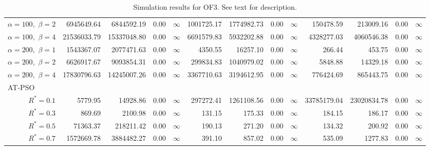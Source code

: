 \documentclass[cmbright]{staauth}
\begin{document}
\begin{table}[ht]
{\begin{tabular}{r|rrrr|rrrr|rrrr}
  $\alpha = 100,$ $\beta =2$ & 6945649.64 & 6844592.19 & 0.00 & $\infty$ & 1001725.17 & 1774982.73 & 0.00 & $\infty$ & 150478.59 & 213009.16 & 0.00 & $\infty$ \\
  $\alpha = 100,$ $\beta =4$ & 21536033.79 & 15337048.80 & 0.00 & $\infty$ & 6691579.83 & 5932202.88 & 0.00 & $\infty$ & 4328277.03 & 4060546.38 & 0.00 & $\infty$ \\
  $\alpha = 200,$ $\beta =1$ & 1543367.07 & 2077471.63 & 0.00 & $\infty$ & 4350.55 & 16257.10 & 0.00 & $\infty$ & 266.44 & 453.75 & 0.00 & $\infty$ \\
  $\alpha = 200,$ $\beta =2$ & 6626917.67 & 9093854.31 & 0.00 & $\infty$ & 299834.83 & 1040979.02 & 0.00 & $\infty$ & 5848.88 & 14329.18 & 0.00 & $\infty$ \\
  $\alpha = 200,$ $\beta =4$ & 17830796.63 & 14245007.26 & 0.00 & $\infty$ & 3367710.63 & 3194612.95 & 0.00 & $\infty$ & 776424.69 & 865443.75 & 0.00 & $\infty$ \\
\hline
\multicolumn{1}{l|}{AT-PSO} &&&&&&&&&&&&\\
  $R^* = 0.1$ & 5779.95 & 14928.86 & 0.00 & $\infty$ & 297272.41 & 1261108.56 & 0.00 & $\infty$ & 33785179.04 & 23020834.78 & 0.00 & $\infty$ \\
  $R^* = 0.3$ & 869.69 & 2100.98 & 0.00 & $\infty$ & 131.15 & 175.33 & 0.00 & $\infty$ & 184.15 & 186.17 & 0.00 & $\infty$ \\
  $R^* = 0.5$ & 71363.37 & 218211.42 & 0.00 & $\infty$ & 190.13 & 271.20 & 0.00 & $\infty$ & 134.32 & 200.92 & 0.00 & $\infty$ \\
  $R^* = 0.7$ & 1572669.78 & 3884482.27 & 0.00 & $\infty$ & 391.10 & 857.02 & 0.00 & $\infty$ & 535.09 & 1277.83 & 0.00 & $\infty$ \\
   \hline
\end{tabular}
}
\caption{Simulation results for OF3. See text for description.}
\label{tab:psosim3}
\end{table}
\end{document}
